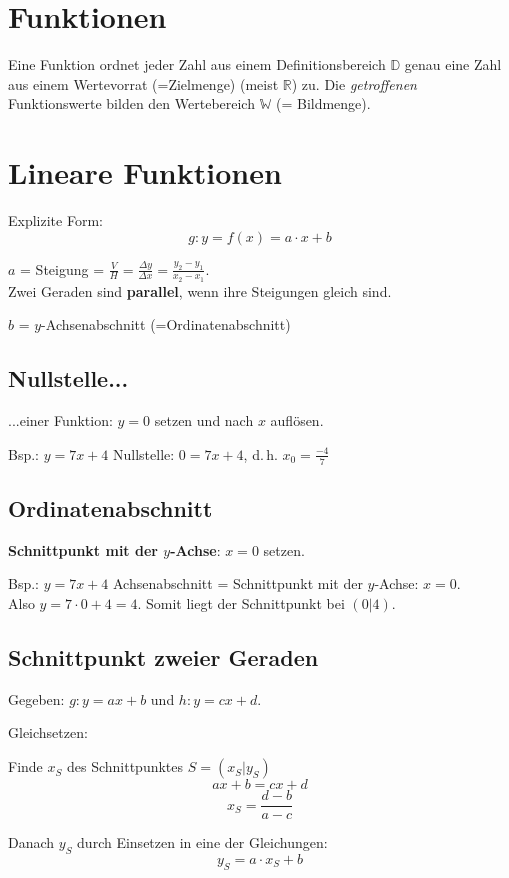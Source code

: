\begin{multicols}{2}
\hrulefill
\section{Funktionen}

Eine Funktion ordnet jeder Zahl aus einem Definitionsbereich
$\mathbb{D}$ genau eine Zahl aus einem Wertevorrat (=Zielmenge) (meist
$\mathbb{R}$)
zu. Die \textit{getroffenen} Funktionswerte bilden den Wertebereich
$\mathbb{W}$ (= Bildmenge).

\hrulefill
\section{Lineare Funktionen}
Explizite Form:
$$g: y = f(x) = a\cdot{}x + b$$

$a$ = Steigung = $\frac{V}{H}=\frac{\Delta y}{\Delta x} = \frac{y_2-y_1}{x_2-x_1}$.\\
Zwei Geraden sind \textbf{parallel}, wenn ihre Steigungen gleich sind.

$b$ = $y$-Achsenabschnitt (=Ordinatenabschnitt)


\subsection{Nullstelle...} ...einer Funktion: $y=0$ setzen und nach $x$
auf\/lösen.

Bsp.: $y=7x+4$ Nullstelle: $0 = 7x+4$, d.\,h. $x_0=\frac{-4}{7}$

\subsection{Ordinatenabschnitt}
\textbf{Schnittpunkt mit der $y$-Achse}: $x=0$ setzen.

Bsp.: $y=7x+4$ Achsenabschnitt = Schnittpunkt mit der $y$-Achse:
$x=0$.\\
Also $y=7\cdot{}0 + 4 = 4$. Somit liegt der Schnittpunkt bei $(0|4)$.


\subsection{Schnittpunkt zweier Geraden}
Gegeben: $g: y=ax+b$ und $h: y=cx+d$.

Gleichsetzen:

Finde $x_S$ des Schnittpunktes $S=(x_S|y_S)$
$$ax+b = cx+d$$
$$x_S = \frac{d-b}{a-c}$$

Danach $y_S$ durch Einsetzen in eine der Gleichungen:
$$y_S = a\cdot{}x_S + b$$


\end{multicols}
